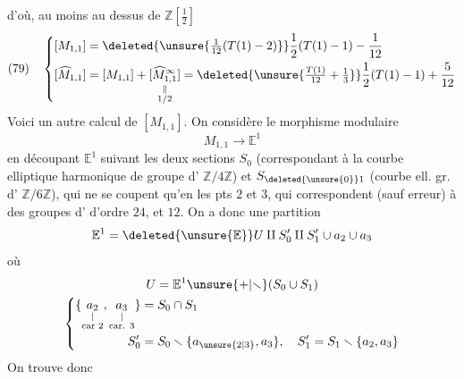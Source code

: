 d'où, au moins au dessus de $\mathbb Z[\frac12]$
\[
(79)\quad\left\{\begin{aligned}
[M_{1,1}]&=\deleted{\unsure{\tfrac1{12}(T(1)-2)}}\frac12(T(1)-1)-\frac1{12}\\
[\widehat M_{1,1}]&=[M_{1,1}]+\underset{\substack{\Vert\\1/2}}{[\widehat M^\infty_{1,1}]}=\deleted{\unsure{\tfrac{T(1)}{12}+\tfrac13}}\frac12(T(1)-1)+\frac5{12}
\end{aligned}\right.
\]
Voici un autre calcul de $[M_{1,1}]$. On considère le morphisme modulaire
\[
M_{1,1}\longrightarrow\mathbb E^1
\]
 en découpant $\mathbb E^1$ suivant les deux sections $S_0$ (correspondant à la courbe elliptique harmonique de groupe d' $\mathbb Z/4\mathbb Z$) et $S_{\deleted{\unsure{0}}1}$  (courbe ell.   gr. d' $\mathbb Z/6\mathbb Z$), qui ne se coupent qu'en les pts $2$ et $3$, qui correspondent (sauf erreur) à des groupes d' d'ordre $24$, et $12$. On a donc une partition
\[
\mathbb E^1=\deleted{\unsure{\mathbb E}}U\amalg S'_0\amalg S'_1\cup a_2\cup a_3
\]
où 
\[
\begin{gathered}
U=\mathbb E^1\unsure{+|\smallsetminus}(S_0\cup S_1)\\
\left\{\begin{aligned}
\{\underset{\substack{|\\\text{car }2}}{a_2},\underset{\substack{|\\\text{car. }3}}{a_3}\}&=S_0\cap S_1\\
S'_0&=S_0\smallsetminus\{a_{\unsure{2|3}},a_3\},\quad S'_1=S_1\smallsetminus\{a_2,a_3\}
\end{aligned}\right.
\end{gathered}
\]
On trouve donc

